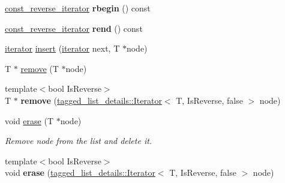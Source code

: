 \begin{DoxyCompactItemize}
\item 
\mbox{\label{classglow_1_1_tagged_list_a47d9a4a84ace20036f53e5811cdee474}} 
\hyperlink{classglow_1_1tagged__list__details_1_1_iterator}{const\+\_\+reverse\+\_\+iterator} {\bfseries rbegin} () const
\item 
\mbox{\label{classglow_1_1_tagged_list_a55875b4d0aa7c59be6d115f45fe7b8d0}} 
\hyperlink{classglow_1_1tagged__list__details_1_1_iterator}{const\+\_\+reverse\+\_\+iterator} {\bfseries rend} () const
\item 
\hyperlink{classglow_1_1tagged__list__details_1_1_iterator}{iterator} \hyperlink{classglow_1_1_tagged_list_a12dbae092e95c3562261f30b7021ec2e}{insert} (\hyperlink{classglow_1_1tagged__list__details_1_1_iterator}{iterator} next, T $\ast$node)
\item 
T $\ast$ \hyperlink{classglow_1_1_tagged_list_ac6e5699b5c9c7d3a01e144185b22bb72}{remove} (T $\ast$node)
\item 
\mbox{\label{classglow_1_1_tagged_list_aeebad1aed2c14218980c9ca366da43a4}} 
{\footnotesize template$<$bool Is\+Reverse$>$ }\\T $\ast$ {\bfseries remove} (\hyperlink{classglow_1_1tagged__list__details_1_1_iterator}{tagged\+\_\+list\+\_\+details\+::\+Iterator}$<$ T, Is\+Reverse, false $>$ node)
\item 
\mbox{\label{classglow_1_1_tagged_list_a42f5b4ce3ea9953a430af8dadba14165}} 
void \hyperlink{classglow_1_1_tagged_list_a42f5b4ce3ea9953a430af8dadba14165}{erase} (T $\ast$node)
\begin{DoxyCompactList}\small\item\em Remove {\ttfamily node} from the list and delete it. \end{DoxyCompactList}\item 
\mbox{\label{classglow_1_1_tagged_list_ae3c8b8211d2e0067255e28893dec3ed3}} 
{\footnotesize template$<$bool Is\+Reverse$>$ }\\void {\bfseries erase} (\hyperlink{classglow_1_1tagged__list__details_1_1_iterator}{tagged\+\_\+list\+\_\+details\+::\+Iterator}$<$ T, Is\+Reverse, false $>$ node)
\item 
\mbox{\label{classglow_1_1_tagged_list_aeb1e17b2351c727e77c80af288bd36ac}} 

\end{DoxyCompactItemize}
